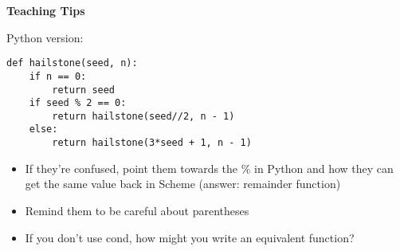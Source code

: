 \begin{guide}
\begin{blocksection}
\textbf{Teaching Tips}

Python version:
\begin{lstlisting}
def hailstone(seed, n):
    if n == 0:
        return seed
    if seed % 2 == 0:
        return hailstone(seed//2, n - 1)
    else:
        return hailstone(3*seed + 1, n - 1)
\end{lstlisting}
\begin{itemize}
    \item If they’re confused, point them towards the \% in Python and how they can get the same value back in Scheme (answer: remainder function) 
    \item Remind them to be careful about parentheses
    \item If you don’t use cond, how might you write an equivalent function? 
\end{itemize}
\end{blocksection}
\end{guide}